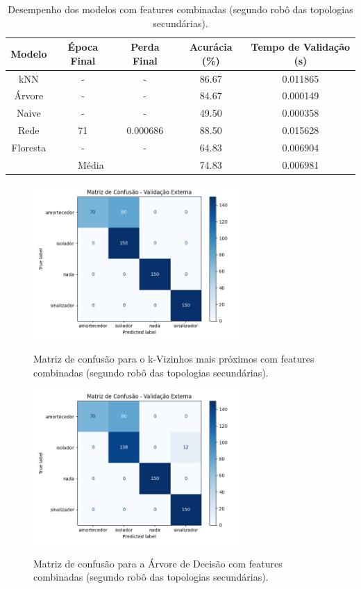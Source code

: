 \begin{table}[H]
\caption{Desempenho dos modelos com features combinadas (segundo robô das topologias secundárias).}
\centering
\begin{tabular}{ccccc}
\hline
\textbf{Modelo} & \textbf{Época Final} & \textbf{Perda Final} & \textbf{Acurácia (\%)} & \textbf{Tempo de Validação (s)}  \\
\hline
kNN      & - & - & 86.67 & 0.011865 \\
Árvore   & - & - & 84.67 & 0.000149 \\
Naive    & - & - & 49.50 & 0.000358 \\
Rede     & 71 & 0.000686 & 88.50 & 0.015628 \\
Floresta & - & - & 64.83 & 0.006904 \\
\hline
\multicolumn{3}{c}{Média} & 74.83 & 0.006981 \\
\hline
\end{tabular}
\fonte{}
\label{tab:modelos_featcomb_robo2}
\end{table}

\begin{figure}[H]
\centering
\caption{Matriz de confusão para o k-Vizinhos mais próximos com features combinadas (segundo robô das topologias secundárias).}
\includegraphics[width=0.7\textwidth]{figuras/Resultados/multi_segundo_Teste5_knn.png}
\label{fig:mc_featcomb_knn_robo2_t5}
\fonte{}
\end{figure}

\begin{figure}[H]
\centering
\caption{Matriz de confusão para a Árvore de Decisão com features combinadas (segundo robô das topologias secundárias).}
\includegraphics[width=0.7\textwidth]{figuras/Resultados/multi_segundo_Teste5_tree.png}
\label{fig:mc_featcomb_tree_robo2_t5}
\fonte{}
\end{figure}

